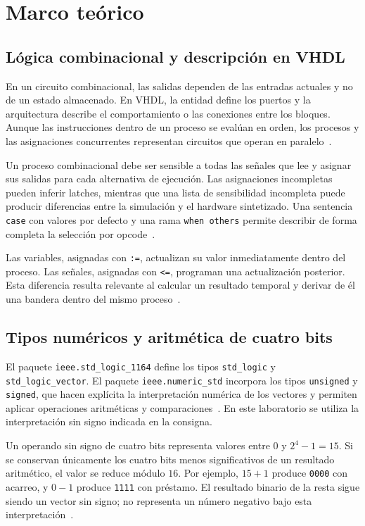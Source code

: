 \section{Marco teórico}

\subsection{Lógica combinacional y descripción en VHDL}
En un circuito combinacional, las salidas dependen de las entradas
actuales y no de un estado almacenado. En VHDL, la entidad define
los puertos y la arquitectura describe el comportamiento o las
conexiones entre los bloques. Aunque las instrucciones dentro de un
proceso se evalúan en orden, los procesos y las asignaciones
concurrentes representan circuitos que operan en paralelo~\cite{fundamentos}.

Un proceso combinacional debe ser sensible a todas las señales que
lee y asignar sus salidas para cada alternativa de ejecución. Las
asignaciones incompletas pueden inferir latches, mientras que una
lista de sensibilidad incompleta puede producir diferencias entre
la simulación y el hardware sintetizado. Una sentencia \texttt{case}
con valores por defecto y una rama \texttt{when others} permite
describir de forma completa la selección por opcode~\cite{combinacional}.

Las variables, asignadas con \texttt{:=}, actualizan su valor
inmediatamente dentro del proceso. Las señales, asignadas con
\texttt{<=}, programan una actualización posterior. Esta diferencia
resulta relevante al calcular un resultado temporal y derivar de
él una bandera dentro del mismo proceso~\cite{fundamentos}.

\subsection{Tipos numéricos y aritmética de cuatro bits}
El paquete \texttt{ieee.std\_logic\_1164} define los tipos
\texttt{std\_logic} y \texttt{std\_logic\_vector}. El paquete
\texttt{ieee.numeric\_std} incorpora los tipos \texttt{unsigned} y
\texttt{signed}, que hacen explícita la interpretación numérica de
los vectores y permiten aplicar operaciones aritméticas y
comparaciones~\cite{combinacional}. En este laboratorio se utiliza
la interpretación sin signo indicada en la consigna.

Un operando sin signo de cuatro bits representa valores entre
$0$ y $2^4-1=15$. Si se conservan únicamente los cuatro bits menos
significativos de un resultado aritmético, el valor se reduce
módulo $16$. Por ejemplo, $15+1$ produce \texttt{0000} con acarreo,
y $0-1$ produce \texttt{1111} con préstamo. El resultado binario
de la resta sigue siendo un vector sin signo; no representa un
número negativo bajo esta interpretación~\cite{casoalu}.

